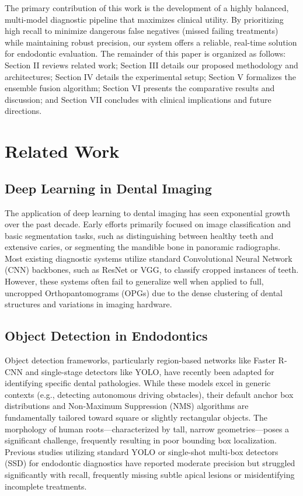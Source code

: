 \documentclass[conference]{IEEEtran}
\begin{document}
The primary contribution of this work is the development of a highly balanced, multi-model diagnostic pipeline that maximizes clinical utility. By prioritizing high recall to minimize dangerous false negatives (missed failing treatments) while maintaining robust precision, our system offers a reliable, real-time solution for endodontic evaluation. The remainder of this paper is organized as follows: Section II reviews related work; Section III details our proposed methodology and architectures; Section IV details the experimental setup; Section V formalizes the ensemble fusion algorithm; Section VI presents the comparative results and discussion; and Section VII concludes with clinical implications and future directions.

\section{Related Work}

\subsection{Deep Learning in Dental Imaging}
The application of deep learning to dental imaging has seen exponential growth over the past decade. Early efforts primarily focused on image classification and basic segmentation tasks, such as distinguishing between healthy teeth and extensive caries, or segmenting the mandible bone in panoramic radiographs. Most existing diagnostic systems utilize standard Convolutional Neural Network (CNN) backbones, such as ResNet or VGG, to classify cropped instances of teeth. However, these systems often fail to generalize well when applied to full, uncropped Orthopantomograms (OPGs) due to the dense clustering of dental structures and variations in imaging hardware.

\subsection{Object Detection in Endodontics}
Object detection frameworks, particularly region-based networks like Faster R-CNN and single-stage detectors like YOLO, have recently been adapted for identifying specific dental pathologies. While these models excel in generic contexts (e.g., detecting autonomous driving obstacles), their default anchor box distributions and Non-Maximum Suppression (NMS) algorithms are fundamentally tailored toward square or slightly rectangular objects. The morphology of human roots---characterized by tall, narrow geometries---poses a significant challenge, frequently resulting in poor bounding box localization. Previous studies utilizing standard YOLO or single-shot multi-box detectors (SSD) for endodontic diagnostics have reported moderate precision but struggled significantly with recall, frequently missing subtle apical lesions or misidentifying incomplete treatments.
\end{document}
